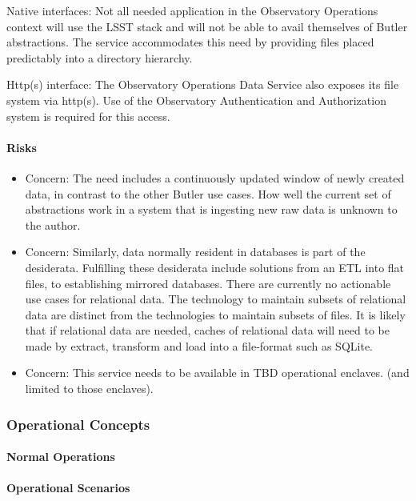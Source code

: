 Native interfaces: Not all needed application in the Observatory Operations context
will use the LSST stack and will not be able to avail themselves of Butler abstractions.
The service accommodates this need by providing files placed predictably into a
directory hierarchy.

Http(s) interface: The Observatory Operations Data Service also exposes its
file system via http(s). Use of the Observatory Authentication and Authorization
system is required for this access.

\paragraph{Risks}

\begin{itemize}

\item Concern: The need includes a continuously updated window of newly created
data, in contrast to the other Butler use cases.  How well the current set of
abstractions work in a system that is ingesting new raw data  is unknown to the
author.

\item Concern: Similarly, data normally resident in databases is part of the desiderata.
Fulfilling these desiderata include solutions from an ETL into flat files, to
establishing mirrored databases. There are currently no actionable use cases
for relational data. The technology to maintain subsets of relational data are distinct
from the technologies to maintain subsets of files. It is likely that if relational data are
needed, caches of relational data will need to be made by extract, transform and load
into a file-format such as SQLite.

\item Concern: This service needs to be available in TBD operational enclaves. (and limited to those enclaves).

\end{itemize}

\subsubsection{Operational Concepts}

\paragraph{Normal Operations}

\paragraph{Operational Scenarios}
